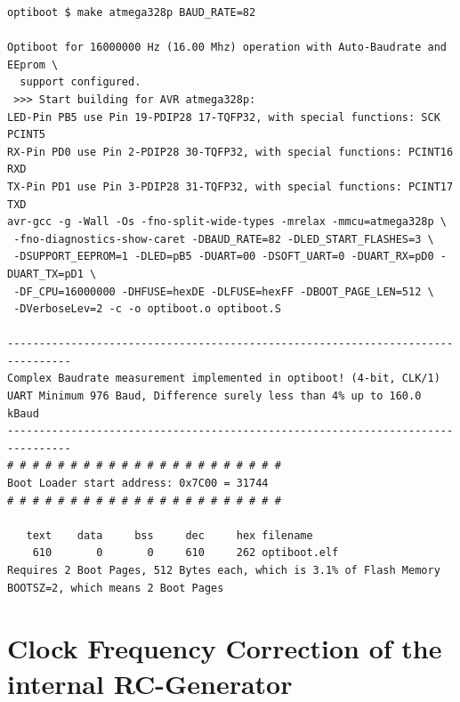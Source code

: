 \begin{verbatim}
optiboot $ make atmega328p BAUD_RATE=82

Optiboot for 16000000 Hz (16.00 Mhz) operation with Auto-Baudrate and EEprom \
  support configured.
 >>> Start building for AVR atmega328p:
LED-Pin PB5 use Pin 19-PDIP28 17-TQFP32, with special functions: SCK PCINT5
RX-Pin PD0 use Pin 2-PDIP28 30-TQFP32, with special functions: PCINT16 RXD
TX-Pin PD1 use Pin 3-PDIP28 31-TQFP32, with special functions: PCINT17 TXD
avr-gcc -g -Wall -Os -fno-split-wide-types -mrelax -mmcu=atmega328p \
 -fno-diagnostics-show-caret -DBAUD_RATE=82 -DLED_START_FLASHES=3 \
 -DSUPPORT_EEPROM=1 -DLED=pB5 -DUART=00 -DSOFT_UART=0 -DUART_RX=pD0 -DUART_TX=pD1 \
 -DF_CPU=16000000 -DHFUSE=hexDE -DLFUSE=hexFF -DBOOT_PAGE_LEN=512 \
 -DVerboseLev=2 -c -o optiboot.o optiboot.S

--------------------------------------------------------------------------------
Complex Baudrate measurement implemented in optiboot! (4-bit, CLK/1)
UART Minimum 976 Baud, Difference surely less than 4% up to 160.0 kBaud
--------------------------------------------------------------------------------
# # # # # # # # # # # # # # # # # # # # # #
Boot Loader start address: 0x7C00 = 31744
# # # # # # # # # # # # # # # # # # # # # #

   text    data     bss     dec     hex filename
    610       0       0     610     262 optiboot.elf
Requires 2 Boot Pages, 512 Bytes each, which is 3.1% of Flash Memory
BOOTSZ=2, which means 2 Boot Pages

\end{verbatim}


\section{Clock Frequency Correction of the internal RC-Generator}

